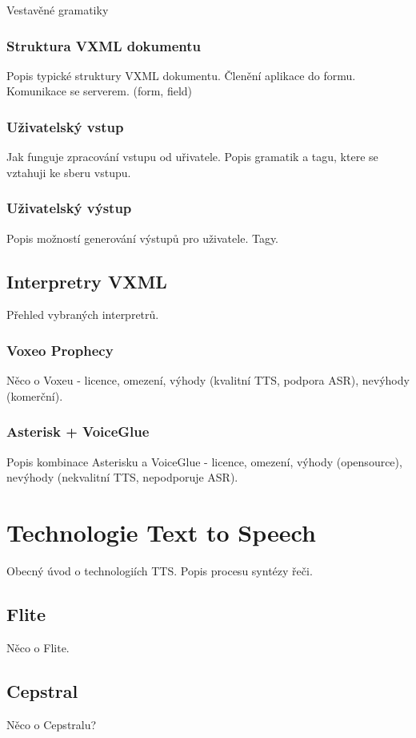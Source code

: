 \documentclass[ing,male,java,dept460]{diploma}						%
\begin{document}
Vestavěné gramatiky

\subsubsection{Struktura VXML dokumentu}
Popis typické struktury VXML dokumentu. Členění aplikace do formu. Komunikace se serverem. (form, field)

\subsubsection{Uživatelský vstup}
Jak funguje zpracování vstupu od uřivatele. Popis gramatik a tagu, ktere se vztahuji ke sberu vstupu.

\subsubsection{Uživatelský výstup}
Popis možností generování výstupů pro uživatele. Tagy.

\subsection{Interpretry VXML}
Přehled vybraných interpretrů.

\subsubsection{Voxeo Prophecy}
Něco o Voxeu - licence, omezení, výhody (kvalitní TTS, podpora ASR), nevýhody (komerční).

\subsubsection{Asterisk + VoiceGlue}
Popis kombinace Asterisku a VoiceGlue - licence, omezení, výhody (opensource), nevýhody (nekvalitní TTS, nepodporuje ASR).

\section{Technologie Text to Speech}
\label{sec:TTS}
Obecný úvod o technologiích TTS. Popis procesu syntézy řeči.

\subsection{Flite}
Něco o Flite.

\subsection{Cepstral}
Něco o Cepstralu?
\end{document}

